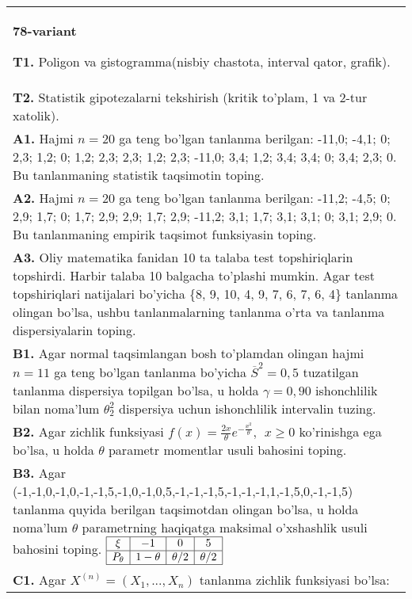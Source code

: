 \documentclass{article}
\begin{document}
\begin{tabular}{m{17cm}}
\textbf{78-variant}
\newline

\textbf{T1.} 
Poligon va gistogramma(nisbiy chastota, interval qator, grafik).
\\
\textbf{T2.} 
Statistik gipotezalarni tekshirish (kritik to'plam, 1 va 2-tur xatolik).
\\
\textbf{A1.} 
Hajmi \(n = 20\) ga teng bo'lgan tanlanma berilgan: -11,0; -4,1; 0; 2,3; 1,2; 0; 1,2; 2,3; 2,3; 1,2; 2,3; -11,0; 3,4; 1,2; 3,4; 3,4; 0; 3,4; 2,3; 0. Bu tanlanmaning statistik taqsimotin toping.
\\
\textbf{A2.} 
Hajmi \(n = 20\) ga teng bo'lgan tanlanma berilgan: -11,2; -4,5; 0; 2,9; 1,7; 0; 1,7; 2,9; 2,9; 1,7; 2,9; -11,2; 3,1; 1,7; 3,1; 3,1; 0; 3,1; 2,9; 0. Bu tanlanmaning empirik taqsimot funksiyasin toping.
\\
\textbf{A3.} 
Oliy matematika fanidan 10 ta talaba test topshiriqlarin topshirdi. Harbir talaba 10 balgacha to'plashi mumkin. Agar test topshiriqlari natijalari bo'yicha \{8, 9, 10, 4, 9, 7, 6, 7, 6, 4\} tanlanma olingan bo'lsa, ushbu tanlanmalarning tanlanma o'rta va tanlanma dispersiyalarin toping.
\\
\textbf{B1.} 
Agar normal taqsimlangan bosh to'plamdan olingan hajmi \(n = 11\) ga teng bo'lgan tanlanma bo'yicha \({\overline{S}}^{2} = 0,5\) tuzatilgan tanlanma dispersiya topilgan bo'lsa, u holda \(\gamma = 0,90\) ishonchlilik bilan noma'lum \(\theta_{2}^{2}\) dispersiya uchun ishonchlilik intervalin tuzing.
\\
\textbf{B2.} 
Agar zichlik funksiyasi \(f(x) = \frac{2x}{\theta}e^{- \frac{x^{2}}{\theta}},\ \ x \geq 0\) ko'rinishga ega bo'lsa, u holda \(\theta\) parametr momentlar usuli bahosini toping.
\\
\textbf{B3.} 
Agar (-1,-1,0,-1,0,-1,-1,5,-1,0,-1,0,5,-1,-1,-1,5,-1,-1,-1,1,-1,5,0,-1,-1,5) tanlanma quyida berilgan taqsimotdan olingan bo'lsa, u holda noma'lum \(\theta\) parametrning haqiqatga maksimal o'xshashlik usuli bahosini toping.
$\begin{array}{|c|c|c|c|}
    \hline
    \xi & - 1 & 0 & 5\\
    \hline
    P_{\theta} & 1 - \theta & \theta/2 & \theta/2 \\
    \hline
\end{array}$
\\
\textbf{C1.} 
Agar \(X^{(n)} = \left( X_{1},...,X_{n} \right)\) tanlanma zichlik funksiyasi bo'lsa: \(f(x,\theta) = \left\{ \begin{matrix}

\end{matrix}
\end{tabular}
\end{document}
